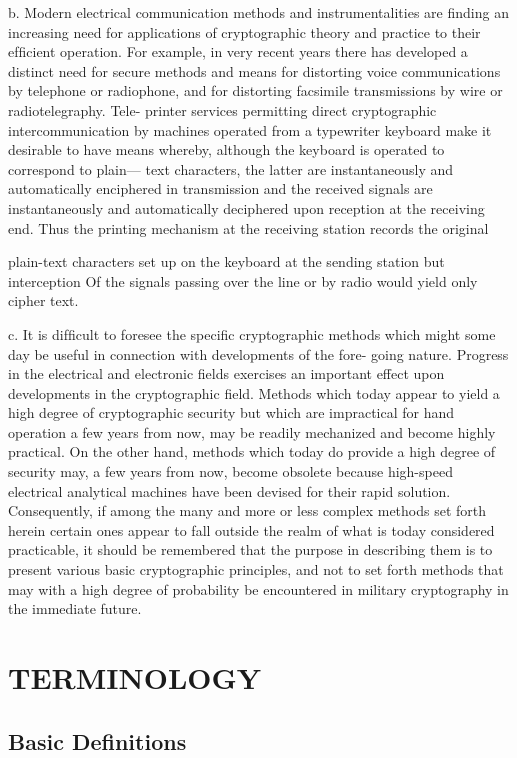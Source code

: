 b. Modern electrical communication methods and instrumentalities are
ﬁnding an increasing need for applications of cryptographic theory and
practice to their efﬁcient operation. For example, in very recent years
there has developed a distinct need for secure methods and means for
distorting voice communications by telephone or radiophone, and
for distorting facsimile transmissions by wire or radiotelegraphy. Tele-
printer services permitting direct cryptographic intercommunication by
machines operated from a typewriter keyboard make it desirable to have
means whereby, although the keyboard is operated to correspond to plain—
text characters, the latter are instantaneously and automatically
enciphered in transmission and the received signals are instantaneously
and automatically deciphered upon reception at the receiving end. Thus
the printing mechanism at the receiving station records the original


plain-text characters set up on the keyboard at the sending station but
interception Of the signals passing over the line or by radio would yield
only cipher text.

c. It is difﬁcult to foresee the speciﬁc cryptographic methods which
might some day be useful in connection with developments of the fore-
going nature. Progress in the electrical and electronic ﬁelds exercises an
important effect upon developments in the cryptographic ﬁeld. Methods
which today appear to yield a high degree of cryptographic security but
which are impractical for hand operation a few years from now, may be
readily mechanized and become highly practical. On the other hand,
methods which today do provide a high degree of security may, a few
years from now, become obsolete because high-speed electrical analytical
machines have been devised for their rapid solution. Consequently, if
among the many and more or less complex methods set forth herein
certain ones appear to fall outside the realm of what is today considered
practicable, it should be remembered that the purpose in describing them
is to present various basic cryptographic principles, and not to set forth
methods that may with a high degree of probability be encountered in
military cryptography in the immediate future.

\section{TERMINOLOGY}

\subsection{Basic Definitions}

